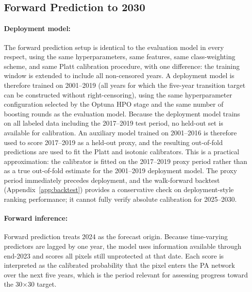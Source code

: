 \documentclass[12pt]{article}
\theoremstyle{break}
\begin{document}
\subsection{Forward Prediction to 2030}
\label{sec:forward}

\paragraph{Deployment model:}
The forward prediction setup is identical to the evaluation model in every respect,
using the same hyperparameters, same features, same class-weighting scheme, and same
Platt calibration procedure, with one difference: the training window is extended
to include all non-censored years. A deployment model is therefore trained on
2001--2019 (all years for which the five-year transition target can be constructed
without right-censoring), using the same hyperparameter configuration selected by
the Optuna HPO stage and the same number of boosting rounds as the evaluation model.
Because the deployment model trains on all labeled data including the 2017--2019
test period, no held-out set is available for calibration. An auxiliary model trained
on 2001--2016 is therefore used to score 2017--2019 as a held-out proxy, and the
resulting out-of-fold predictions are used to fit the Platt and isotonic calibrators.
This is a practical approximation: the calibrator is fitted on the 2017--2019 proxy
period rather than as a true out-of-fold estimate for the 2001--2019 deployment model.
The proxy period immediately precedes deployment, and the walk-forward backtest
(Appendix~\ref{app:backtest}) provides a conservative check on deployment-style
ranking performance; it cannot fully verify absolute calibration for 2025--2030.

\paragraph{Forward inference:}
Forward prediction treats 2024 as the forecast origin. Because time-varying predictors
are lagged by one year, the model uses information available through end-2023 and
scores all pixels still unprotected at that date. Each score is interpreted as the
calibrated probability that the pixel enters the PA network over the next five years,
which is the period relevant for assessing progress toward the 30$\times$30 target.
\end{document}

